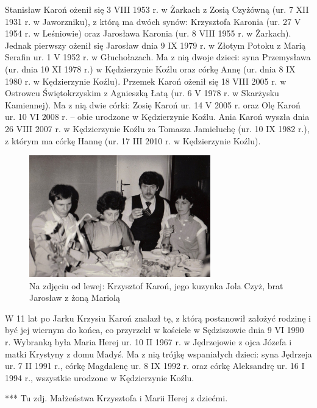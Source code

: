 Stanisław Karoń ożenił się 3 VIII 1953 r. w Żarkach z Zosią Czyżówną (ur. 7 XII 1931 r. w Jaworzniku), z którą ma dwóch synów: Krzysztofa Karonia (ur. 27 V 1954 r. w Leśniowie) oraz Jarosława Karonia (ur. 8 VIII 1955 r. w Żarkach). Jednak pierwszy ożenił się Jarosław dnia 9 IX 1979 r. w Złotym Potoku z Marią Serafin ur. 1 V 1952 r. w Głuchołazach. Ma z nią dwoje dzieci: syna Przemysława (ur. dnia 10 XI 1978 r.) w Kędzierzynie Koźlu oraz córkę Annę (ur. dnia 8 IX 1980 r. w Kędzierzynie Koźlu). Przemek Karoń ożenił się 18 VIII 2005 r. w Ostrowcu Świętokrzyskim z Agnieszką Łatą (ur. 6 V 1978 r. w Skarżysku Kamiennej). Ma z nią dwie córki: Zosię Karoń ur. 14 V 2005 r. oraz Olę Karoń ur. 10 VI 2008 r. -- obie urodzone w Kędzierzynie Koźlu. Ania Karoń wyszła dnia 26 VIII 2007 r. w Kędzierzynie Koźlu za Tomasza Jamieluchę (ur. 10 IX 1982 r.), z którym ma córkę Hannę (ur. 17 III 2010 r. w Kędzierzynie Koźlu).

\begin{figure}[!h]
\begin{center}
\includegraphics[width=0.7\textwidth]{zdjecia/krzysztof_karon_jarek_karon_z_zona.jpg}
\caption[Krzysztof, Jarosław i Mariola Karoniowie]{Na zdjęciu od lewej: Krzysztof Karoń, jego kuzynka Jola Czyż, brat Jarosław z żoną Mariolą}
\label{rys:krzysztof_karon_jarek_karon_z_zona.jpg}
\end{center}
\end{figure}

W 11 lat po Jarku Krzysiu Karoń znalazł tę, z którą postanowił założyć rodzinę i być jej wiernym do końca, co przyrzekł w kościele w Sędziszowie dnia 9 VI 1990 r. Wybranką była Maria Herej ur. 10 II 1967 r. w Jędrzejowie z ojca Józefa i matki Krystyny z domu Madyś. Ma z nią trójkę wspaniałych dzieci: syna Jędrzeja ur. 7 II 1991 r., córkę Magdalenę ur. 8 IX 1992 r. oraz córkę Aleksandrę ur. 16 I 1994 r., wszystkie urodzone w Kędzierzynie Koźlu.


{\color{red}
*** Tu zdj. Małżeństwa Krzysztofa i Marii Herej z dziećmi.}